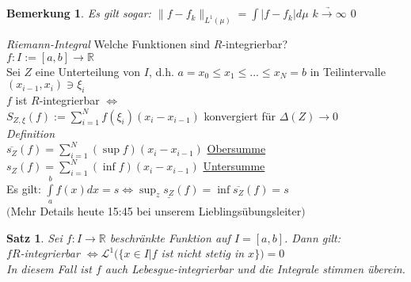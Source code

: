 \documentclass[11pt]{memoir}
\theoremstyle{changebreak}
\newtheorem{Bemerkung}{Bemerkung}[chapter]
\newtheorem{Satz}{Satz}[chapter]
\begin{document}
\begin{Bemerkung}
Es gilt sogar: $\|f - f_k\|_{L^1(\mu)} = \int |f - f_k|d\mu$ $\underrightarrow{k \rightarrow \infty}$ $0$
\end{Bemerkung}

\emph{Riemann-Integral}
Welche Funktionen sind $R$-integrierbar? \\
$f: I:=[a, b] \rightarrow \mathbb R$ \\
Sei $Z$ eine Unterteilung von $I$, d.h. $a=x_0\leq x_1 \leq ... \leq x_N = b$ in Teilintervalle $(x_{i-1}, x_i) \ni \xi_i$ \\
$f$ ist $R$-integrierbar $\Leftrightarrow$ \\
$S_{Z, \xi} (f) := \sum\limits_{i=1}^N f(\xi_i)(x_i - x_{i-1})$ konvergiert für $\Delta(Z) \rightarrow 0$ \\


\emph{Definition} \\
$\overline{s_Z}(f) = \sum\limits_{i=1}^N (\sup f)(x_i  - x_{i-1})$ \underline{Obersumme} \\
\underline{$s_Z$}$(f) = \sum\limits_{i=1}^N (\inf f)(x_i - x_{i-1})$ \underline{Untersumme} \\
Es gilt:
$\int\limits_a^b f(x) dx = s \Leftrightarrow \sup_z \underline{s_Z}(f) = \inf \overline{s_Z}(f) = s$ \\
$($Mehr Details heute 15:45 bei unserem Lieblingsübungsleiter$)$

\begin{Satz}
Sei $f: I \rightarrow \mathbb R$ beschränkte Funktion auf $I = [a, b]$. Dann gilt: \\
$f R$-integrierbar $\Leftrightarrow \mathscr L^1(\{x \in I | f $ ist nicht stetig in $x \}) = 0$ \\
In diesem Fall ist $f$ auch Lebesgue-integrierbar und die Integrale stimmen überein.
\end{Satz}


\end{document}
